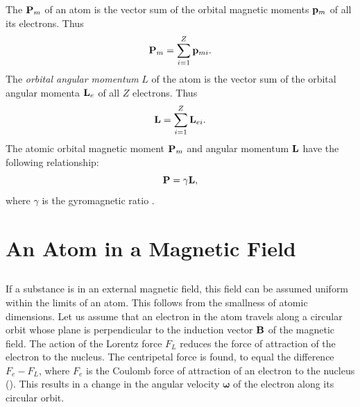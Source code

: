 The  $\vb{P}_{m}$ of an atom is the vector sum of the orbital magnetic moments $\vb{p}_{m}$ of all its electrons. Thus
\begin{equation*}%
\vb{P}_{m} = \sum_{i = 1}^{Z} \vb{p}_{mi}.
\end{equation*}
The \emph{orbital angular momentum} $L$ of the atom is the vector sum of the orbital angular momenta $\vb{L}_{e}$ of all $Z$ electrons. Thus
\begin{equation*}%
\vb{L} = \sum_{i = 1}^{Z} \vb{L}_{ei}.
\end{equation*}
The atomic orbital magnetic moment $\vb{P}_{m}$ and angular momentum $\vb{L}$ have the following relationship:
\begin{equation*}%
\vb{P} = \gamma \vb{L},
\end{equation*}
where $\gamma$ is the gyromagnetic ratio .

\section{An Atom in a Magnetic Field}
\label{sec-26.2}

\subsection{}\label{26.2.1} If a substance is in an external magnetic field, this field can be assumed uniform  within the limits of an atom. This follows from the smallness of atomic dimensions. Let us assume that an electron in the atom travels along a circular orbit whose plane is perpendicular to the induction vector $\vb{B}$ of the magnetic field. The action of the Lorentz force ${F}_{L}$  reduces the force of attraction of the electron to the nucleus. The centripetal force  is found, to equal the difference ${F}_{e} - F_{L}$, where $F_{e}$ is the Coulomb force  of attraction
of an electron to the nucleus (). This results in a change in the angular velocity $\pmb{\omega}$  of the electron along its circular orbit.

